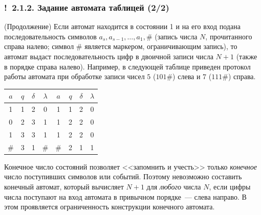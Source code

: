 \documentclass[mathserif,12pt,aspectratio=169]{beamer}
\def\emразделенной{\em разделенной}
\def\em#1{\it\color{blue}#1}
\def\Ok{{\color{green}\textbf{!}\ }}
\begin{document}
\begin{frame}
\frametitle{\Ok 2.1.2. Задание автомата таблицей (2/2)}

\begin{example} (Продолжение)
Если автомат находится в состоянии 1 и на его вход подана
последовательность символов $a_s, a_{s-1},\ldots,a_1, \#$ (запись
числа $N$, прочитанного справа налево; символ \# является маркером,
ограничивающим запись), то автомат выдаст
последовательность цифр в двоичной записи числа $N+1$ (также в
порядке справа налево).
Например, в следующей таблице
приведен протокол работы автомата
при обработке записи чисел $5$ ($101\#$) слева и $7$ ($111\#$) справа.
\begin{center}
\begin{tabular}{c|c|c|c||c|c|c|c}
  $a$ & $q$ & $\delta$ & $\lambda$ & $a$ & $q$ & $\delta$ & $\lambda$ \\
  \hline
  1 & 1 & 2 & 0 & 1 & 1 & 2 & 0\\
  0 & 2 & 3 & 1 & 1 & 2 & 2 & 0\\
  1 & 3 & 3 & 1 & 1 & 2 & 2 & 0\\
$\#$ & 3 & 1 & $\#$ & $\#$ & 2 & 1 & 1\\
\end{tabular}
\end{center}
\end{example}

\begin{digress}
Конечное число состояний позволяет
<<запомнить и учесть>> 
только {\em конечное} число поступивших символов или событий.  
Поэтому невозможно 
составить конечный автомат, 
который вычисляет $N+1$ для {\em любого}
числа $N$, если цифры числа поступают на вход автомата в привычном порядке~--- слева направо.
В этом проявляется ограниченность конструкции
конечного автомата.   
\end{digress}

\end{frame}
\end{document}
